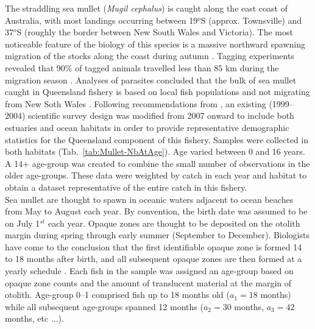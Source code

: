 The straddling sea mullet ({\it Mugil cephalus}) is caught along the east coast of Australia, with most landings occurring between 19$^{o}$S (approx. Townsville) and 37$^{o}$S (roughly the border between New South Wales and Victoria). The most noticeable feature of the biology of this species is a massive northward spawning migration of the stocks along the coast during autumn \citep{Kesteven53a}. Tagging experiments revealed that 90\% of tagged animals travelled less than 85 km during the migration season \citep{Kesteven53a}. Analyses of parasites concluded that the bulk of sea mullet caught in Queensland fishery is based on local fish populations and not migrating from New Soth Wales \citep{Lester2009129}. Following recommendations from \cite{Bell2005r}, an existing (1999--2004) scientific survey design was modified from 2007 onward to include both estuaries and ocean habitats in order to provide representative demographic statistics for the Queensland component of this fishery. Samples were collected in both habitats (Tab.~\ref{tab:Mullet-NbAtAge}). Age varied between 0 and 16 years. A 14+ age-group was created to combine the small number of observations in the older age-groups. These data were weighted by catch in each year and habitat to obtain a dataset representative of the entire catch in this fishery. \\

Sea mullet are thought to spawn in oceanic waters adjacent to ocean beaches from May to August each year. By convention, the birth date was assumed to be on July 1$^{st}$ each year. Opaque zones are thought to be deposited on the otolith margin during spring through early summer (September to December). Biologists have come to the conclusion that the first identifiable opaque zone is formed 14 to 18 months after birth, and all subsequent opaque zones are then formed at a yearly schedule \citep{Smith2003}. Each fish in the sample was assigned an age-group based on opaque zone counts and the amount of translucent material at the margin of otolith. Age-group 0--1 comprised fish up to 18 months old ($a_{1}=18$ months) while all subsequent age-groups spanned 12 months ($a_{2} = 30$ months, $a_{3}= 42$ months, etc ...).\\

